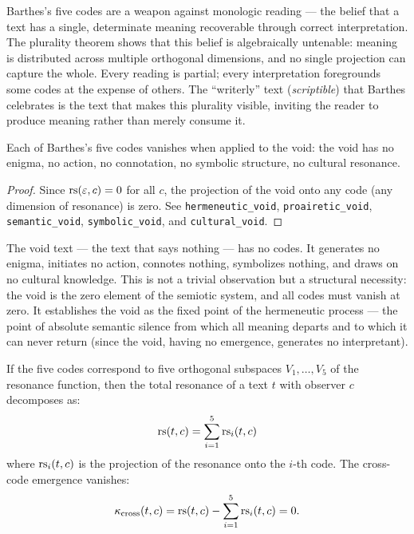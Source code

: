 \begin{interpretation}
Barthes's five codes are a weapon against monologic reading --- the
belief that a text has a single, determinate meaning recoverable
through correct interpretation. The plurality theorem shows that this
belief is algebraically untenable: meaning is distributed across
multiple orthogonal dimensions, and no single projection can capture
the whole. Every reading is partial; every interpretation foregrounds
some codes at the expense of others. The ``writerly'' text
(\textit{scriptible}) that Barthes celebrates is the text that makes
this plurality visible, inviting the reader to produce meaning rather
than merely consume it.
\end{interpretation}

\begin{theorem}
\label{thm:void-codes}
Each of Barthes's five codes vanishes when applied to the void:
the void has no enigma, no action, no connotation, no symbolic
structure, no cultural resonance.
\end{theorem}

\begin{proof}
Since $\mathrm{rs}(\varepsilon, c) = 0$ for all $c$, the projection of the void
onto any code (any dimension of resonance) is zero. See
\texttt{hermeneutic\_void}, \texttt{proairetic\_void},
\texttt{semantic\_void}, \texttt{symbolic\_void}, and
\texttt{cultural\_void}.
\end{proof}

\begin{interpretation}
The void text --- the text that says nothing --- has no codes. It
generates no enigma, initiates no action, connotes nothing, symbolizes
nothing, and draws on no cultural knowledge. This is not a trivial
observation but a structural necessity: the void is the zero element
of the semiotic system, and all codes must vanish at zero. It
establishes the void as the fixed point of the hermeneutic process
--- the point of absolute semantic silence from which all meaning
departs and to which it can never return (since the void, having no
emergence, generates no interpretant).
\end{interpretation}

\begin{theorem}
\label{thm:code-independence}
If the five codes correspond to five orthogonal subspaces $V_1, \ldots, V_5$ of the resonance function, then the total resonance of a text $t$ with observer $c$ decomposes as:
\[
  \mathrm{rs}(t, c) = \sum_{i=1}^{5} \mathrm{rs}_i(t, c)
\]
where $\mathrm{rs}_i(t, c)$ is the projection of the resonance onto the $i$-th code. The cross-code emergence vanishes:
\[
  \kappa_{\text{cross}}(t, c) = \mathrm{rs}(t, c) - \sum_{i=1}^{5} \mathrm{rs}_i(t, c) = 0.
\]
\end{theorem}

